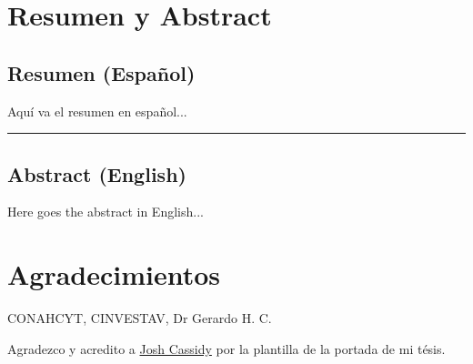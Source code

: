 \documentclass[12pt, a4paper, twoside, openright, final]{book}
\begin{document}


\newpage
\thispagestyle{empty}

\frontmatter


\chapter*{Resumen y Abstract}
\label{ch:abstract}

\section*{Resumen (Español)}
Aquí va el resumen en español...

\vspace{1em}
\hrule
\vspace{1em}

\section*{Abstract (English)}
Here goes the abstract in English...

\newpage
\thispagestyle{empty}

\chapter*{Agradecimientos}
\label{ch: Agradecimientos}
\begin{flushright}
CONAHCYT, CINVESTAV, Dr Gerardo H. C.

Agradezco y acredito a \href{https://www.overleaf.com/learn/latex/How_to_Write_a_Thesis_in_LaTeX_(Part_1)%3A_Basic_Structure}{Josh Cassidy} por la plantilla de la portada de mi tésis.
\end{flushright}

\newpage
\thispagestyle{empty}

\renewcommand{\contentsname}{Contenido}
\tableofcontents %
\renewcommand{\listfigurename}{Lista de figuras}
\listoffigures
\end{document}
